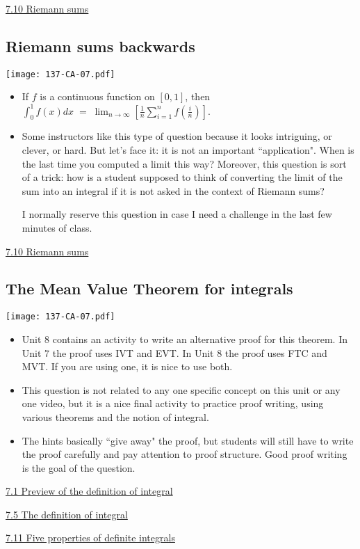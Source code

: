 \documentclass[11pt]{article}
\newcommand {\DS} [1] {${\displaystyle #1}$}
\newcommand{\nl}{\hfill \vspace{-1.1\baselineskip}} %
\newcommand{\vi}{\hspace{8mm} \href{https://www.youtube.com/watch?v=F9lfbCaXOpk&list=PLlwePzQY_wW9vqCkUudCmoOvnNmr9vMuJ&index=1}{7.1 Preview of the definition of integral}}
\newcommand{\vv}{\hspace{8mm} \href{https://www.youtube.com/watch?v=dZ_TWQbksbg&list=PLlwePzQY_wW9vqCkUudCmoOvnNmr9vMuJ&index=5}{7.5 The definition of integral}}
\newcommand{\vx}{\hspace{8mm} \href{https://www.youtube.com/watch?v=k_DPWyRU2Rw&list=PLlwePzQY_wW9vqCkUudCmoOvnNmr9vMuJ&index=10}{7.10 Riemann sums}}
\newcommand{\vxi}{\hspace{8mm} \href{https://www.youtube.com/watch?v=Hco-2q2A_ss&list=PLlwePzQY_wW9vqCkUudCmoOvnNmr9vMuJ&index=11}{7.11 Five properties of definite integrals}}
\begin{document}
\begin{videos}
\vx
\end{videos}

\newpage
\subsection{Riemann sums backwards}

\begin{center}
{ \texttt{[image: 137-CA-07.pdf]}} 
\end{center}

\begin{comments}
\nl
	\begin{itemize}
		\item If $f$ is a continuous function on $[0,1]$, then \DS{\int_0^1 f(x) dx \; = \; \lim_{n \to \infty} \left[ \frac 1n \sum_{i=1}^{n} f\left(\frac in\right) \right] }.
		\item  Some instructors like this type of question because it looks intriguing, or clever, or hard.  But let's face it:  it is not an important ``application".  When is the last time you computed a limit this way?  Moreover, this question is sort of a trick: how is a student supposed to think of converting the limit of the sum into an integral if it is not asked in the context of Riemann sums?
		
		I normally reserve this question in case I need a challenge in the last few minutes of class.
	\end{itemize}
\end{comments}

\begin{videos}
\vx
\end{videos}

\newpage
\subsection{The Mean Value Theorem for integrals}

\begin{center}
{ \texttt{[image: 137-CA-07.pdf]}} 
\end{center}

\begin{comments}
\nl
	\begin{itemize}
		\item Unit 8 contains an activity to write an alternative proof for this theorem.  In Unit 7 the proof uses IVT and EVT.  In Unit 8 the proof uses FTC and MVT.  If you are using one, it is nice to use both.
		\item This question is not related to any one specific concept on this unit or any one video, but it is a nice final activity to practice proof writing, using various theorems and the notion of integral.
		\item The hints basically ``give away" the proof, but students  will still have to write the proof carefully and pay attention to proof structure.  Good proof writing is the goal of the question.
	\end{itemize}
\end{comments}

\begin{videos}
\vi

\vv

\vxi
\end{videos}

\newpage
\end{document}
